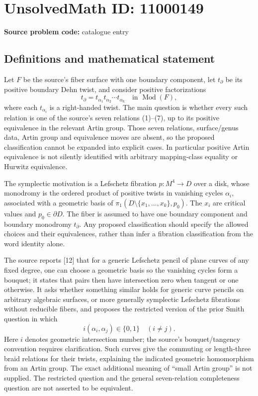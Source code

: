 \documentclass[11pt]{article}
\begin{document}
\section*{UnsolvedMath ID: 11000149}
\textbf{Source problem code:} catalogue entry
\subsection{Definitions and mathematical statement}
Let \(F\) be the source's fiber surface with one boundary component, let \(t_\partial\) be its positive boundary Dehn twist, and consider positive factorizations
\[t_\partial=t_{\alpha_1}t_{\alpha_2}\cdots t_{\alpha_k}\quad\text{in }\operatorname{Mod}(F),\]
where each \(t_{\alpha_i}\) is a right-handed twist. The main question is whether every such relation is one of the source's seven relations (1)--(7), up to its positive equivalence in the relevant Artin group. Those seven relations, surface/genus data, Artin group and equivalence moves are absent, so the proposed classification cannot be expanded into explicit cases. In particular positive Artin equivalence is not silently identified with arbitrary mapping-class equality or Hurwitz equivalence.

The symplectic motivation is a Lefschetz fibration \(p:M^4\to D\) over a disk, whose monodromy is the ordered product of positive twists in vanishing cycles \(\alpha_i\), associated with a geometric basis of \(\pi_1(D\setminus\{x_1,\ldots,x_k\},p_0)\). The \(x_i\) are critical values and \(p_0\in\partial D\). The fiber is assumed to have one boundary component and boundary monodromy \(t_\partial\). Any proposed classification should specify the allowed choices and their equivalences, rather than infer a fibration classification from the word identity alone.

The source reports [12] that for a generic Lefschetz pencil of plane curves of any fixed degree, one can choose a geometric basis so the vanishing cycles form a bouquet; it states that pairs then have intersection zero when tangent or one otherwise. It asks whether something similar holds for generic curve pencils on arbitrary algebraic surfaces, or more generally symplectic Lefschetz fibrations without reducible fibers, and proposes the restricted version of the prior Smith question in which
\[i(\alpha_i,\alpha_j)\in\{0,1\}\quad(i\ne j).\]
Here \(i\) denotes geometric intersection number; the source's bouquet/tangency convention requires clarification. Such curves give the commuting or length-three braid relations for their twists, explaining the indicated geometric homomorphism from an Artin group. The exact additional meaning of ``small Artin group'' is not supplied. The restricted question and the general seven-relation completeness question are not asserted to be equivalent.
\end{document}

